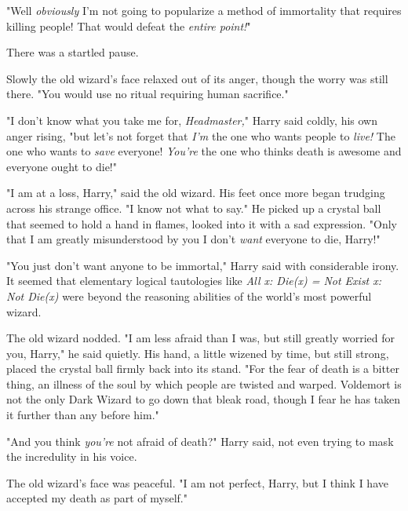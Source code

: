 "Well \emph{obviously} I'm not going to popularize a method of immortality that
requires killing people! That would defeat the \emph{entire point!}"

There was a startled pause.

Slowly the old wizard's face relaxed out of its anger, though the worry was
still there. "You would use no ritual requiring human sacrifice."

"I don't know what you take me for, \emph{Headmaster,}" Harry said coldly, his
own anger rising, "but let's not forget that \emph{I'm} the one who wants
people to \emph{live!} The one who wants to \emph{save} everyone! \emph{You're}
the one who thinks death is awesome and everyone ought to die!"

"I am at a loss, Harry," said the old wizard. His feet once more began trudging
across his strange office. "I know not what to say." He picked up a crystal
ball that seemed to hold a hand in flames, looked into it with a sad
expression. "Only that I am greatly misunderstood by you{\el} I don't
\emph{want} everyone to die, Harry!"

"You just don't want anyone to be immortal," Harry said with considerable
irony. It seemed that elementary logical tautologies like \emph{All x: Die(x) =
Not Exist x: Not Die(x)} were beyond the reasoning abilities of the world's
most powerful wizard.

The old wizard nodded. "I am less afraid than I was, but still greatly worried
for you, Harry," he said quietly. His hand, a little wizened by time, but still
strong, placed the crystal ball firmly back into its stand. "For the fear of
death is a bitter thing, an illness of the soul by which people are twisted and
warped. Voldemort is not the only Dark Wizard to go down that bleak road,
though I fear he has taken it further than any before him."

"And you think \emph{you're} not afraid of death?" Harry said, not even trying
to mask the incredulity in his voice.

The old wizard's face was peaceful. "I am not perfect, Harry, but I think I
have accepted my death as part of myself."

